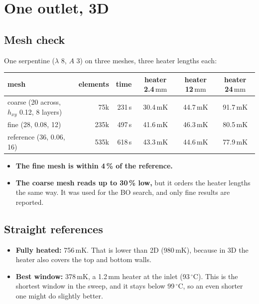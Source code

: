 \documentclass[11pt,a4paper]{article}
\newcommand{\mK}{\ensuremath{\,\mathrm{mK}}}
\newcommand{\mm}{\ensuremath{\,\mathrm{mm}}}
\begin{document}
\section{One outlet, 3D}\label{sec:u3d}
\subsection{Mesh check}
One serpentine ($\lambda$ 8, $A$ 3) on three meshes, three heater lengths each:

\begin{table}[H]
\centering\small
\begin{tabular}{@{}lrrccc@{}}
\toprule
mesh & elements & time & heater 2.4\mm & heater 12\mm & heater 24\mm \\
\midrule
coarse (20 across, $h_{xy}$ 0.12, 8 layers) & 75k & 231\,s & 30.4\mK & 44.7\mK & 91.7\mK \\
fine (28, 0.08, 12) & 235k & 497\,s & 41.6\mK & 46.3\mK & 80.5\mK \\
reference (36, 0.06, 16) & 535k & 618\,s & 43.3\mK & 44.6\mK & 77.9\mK \\
\bottomrule
\end{tabular}
\end{table}

\begin{itemize}
  \item \textbf{The fine mesh is within 4\,\% of the reference.}
  \item \textbf{The coarse mesh reads up to 30\,\% low,} but it orders the heater lengths the same
        way. It was used for the BO search, and only fine results are reported.
\end{itemize}

\subsection{Straight references}
\begin{itemize}
  \item \textbf{Fully heated:} 756\mK. That is lower than 2D (980\mK), because in 3D the heater also
        covers the top and bottom walls.
  \item \textbf{Best window:} 378\mK, a 1.2\mm{} heater at the inlet (93\,$^\circ$C). This is the
        shortest window in the sweep, and it stays below 99\,$^\circ$C, so an even shorter one might do slightly better.
\end{itemize}
\end{document}
